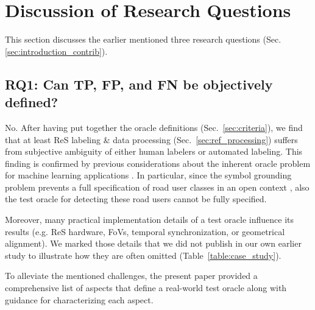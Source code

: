 \documentclass[conference]{IEEEtran}
\begin{document}
\section{Discussion of Research Questions}
\label{sec:discussion}


This section discusses the earlier mentioned three research questions (Sec. \ref{sec:introduction_contrib}). 


\subsection{RQ1: Can TP, FP, and FN be objectively defined?}
\label{sec:discussion_rq1}

No. After having put together the oracle definitions (Sec.~\ref{sec:criteria}), we find that at least ReS labeling \& data processing (Sec.~\ref{sec:ref_processing}) suffers from subjective ambiguity of either human labelers or automated labeling. 
This finding is confirmed by previous considerations about the inherent oracle problem for machine learning applications \cite{Abrecht2021testing}. 
In particular, since the symbol grounding problem prevents a full specification of road user classes in an open context \cite{Salay2019partialspecifications, Abrecht2021testing}, also the test oracle for detecting these road users cannot be fully specified.

Moreover, many practical implementation details of a test oracle influence its results (e.g. ReS hardware, FoVs, temporal synchronization, or geometrical alignment).
We marked those details that we did not publish in our own earlier study to illustrate how they are often omitted (Table~\ref{table:case_study}). 


To alleviate the mentioned challenges, the present paper provided a comprehensive list of aspects that define a real-world test oracle along with guidance for characterizing each aspect. 





\end{document}
